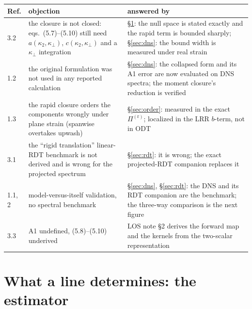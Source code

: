 \documentclass[11pt,a4paper]{article}
\newcommand{\Pir}[1]{\Pi^{(\mathrm r)}_{#1}}
\newcommand{\kperp}{\kappa_\perp}
\begin{document}
\begin{center}\small
\begin{tabular}{p{}p{}p{}}
\toprule
Ref. & objection & answered by \\
\midrule
3.2 & the closure is not closed: eqs.\ (5.7)--(5.10) still need
      $a(\kappa_2,\kperp)$, $c(\kappa_2,\kperp)$ and a $\kperp$ integration &
      \S\ref{sec:los}: the null space is stated exactly and the rapid
      term is bounded sharply; \S\ref{sec:dns}: the bound width is measured
      under real strain \\
1.2 & the original formulation was not used in any reported calculation &
      \S\ref{sec:dns}: the collapsed form and its A1 error are now
      evaluated on DNS spectra; the moment closure's reduction is verified \\
1.3 & the rapid closure orders the components wrongly under plane strain
      (spanwise overtakes upwash) & \S\ref{sec:order}: measured in the
      exact $\Pir{}$; localized in the LRR $b$-term, not in ODT \\
3.1 & the ``rigid translation'' linear-RDT benchmark is not derived and is
      wrong for the projected spectrum & \S\ref{sec:rdt}: it is wrong; the
      exact projected-RDT companion replaces it \\
1.1, 2 & model-versus-itself validation, no spectral benchmark &
      \S\ref{sec:dns}, \S\ref{sec:rdt}: the DNS and its RDT companion are
      the benchmark; the three-way comparison is the next figure \\
3.3 & A1 undefined, (5.8)--(5.10) underived & LOS note \S2 derives the
      forward map and the kernels from the two-scalar representation \\
\bottomrule
\end{tabular}
\end{center}

\section{What a line determines: the estimator}\label{sec:los}
\end{document}
